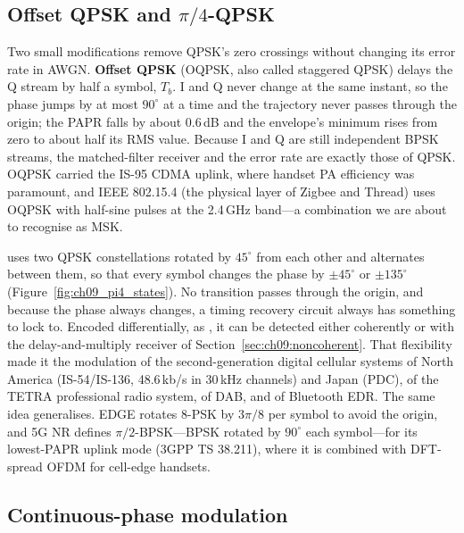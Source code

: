 \subsection{Offset QPSK and \texorpdfstring{$\pi/4$}{pi/4}-QPSK}

Two small modifications remove QPSK's zero crossings without changing its error rate in AWGN.
\textbf{Offset QPSK} (OQPSK, also called staggered QPSK) delays the Q stream by
half a symbol, $T_b$. I and Q never change at the same instant, so the phase jumps by at most
$90^\circ$ at a time and the trajectory never passes through the origin; the PAPR falls by about
0.6\,dB and the envelope's minimum rises from zero to about half its RMS value. Because I and Q are
still independent BPSK streams, the matched-filter receiver and the error rate are exactly those
of QPSK. OQPSK carried the IS-95 CDMA uplink, where handset PA efficiency was paramount, and IEEE
802.15.4 (the physical layer of Zigbee and Thread) uses OQPSK with half-sine pulses at the
2.4\,GHz band---a combination we are about to recognise as MSK.

 uses two QPSK constellations rotated by $45^\circ$ from each other and
alternates between them, so that every symbol changes the phase by $\pm45^\circ$ or $\pm135^\circ$
(Figure~\ref{fig:ch09_pi4_states}). No transition passes through the origin, and because the phase
always changes, a timing recovery circuit always has something to lock to. Encoded
differentially, as , it can be detected either coherently or with the
delay-and-multiply receiver of Section~\ref{sec:ch09:noncoherent}. That flexibility made it the
modulation of the second-generation digital cellular systems of North America (IS-54/IS-136,
48.6\,kb/s in 30\,kHz channels) and Japan (PDC), of the TETRA professional radio system, of DAB,
and of Bluetooth EDR. The same idea generalises. EDGE rotates 8-PSK by $3\pi/8$ per symbol to
avoid the origin, and 5G NR defines $\pi/2$-BPSK---BPSK rotated by $90^\circ$ each symbol---for its
lowest-PAPR uplink mode (3GPP TS 38.211), where it is combined with DFT-spread OFDM for cell-edge
handsets.


\subsection{Continuous-phase modulation}

